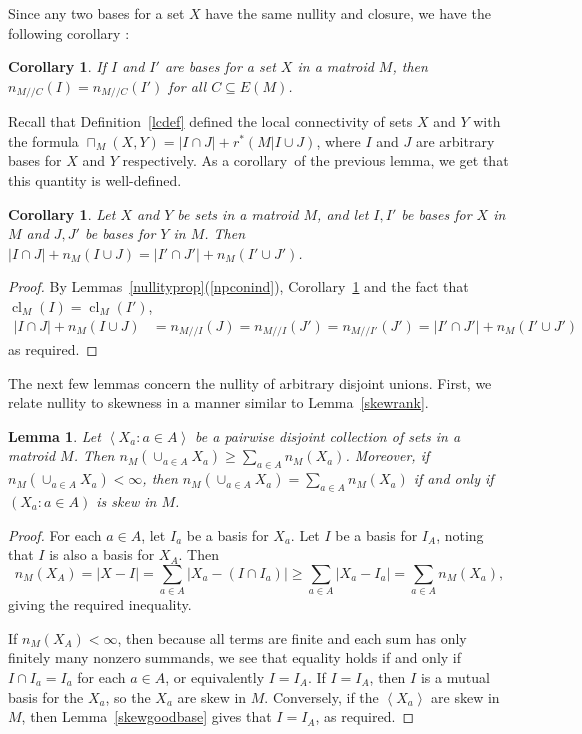 \documentclass{amsart}
\theoremstyle{plain}
\newtheorem{lemma}[theorem]{Lemma}
\newtheorem{corollary}[theorem]{Corollary}
\theoremstyle{definition}
\newcommand{\dcon}{/ \!\! /}
\DeclareMathOperator{\cl}{cl}
\newcommand{\abs}[1]{\left| #1 \right|}
\newcommand{\ab}[1]{\left\langle#1\right\rangle}
\renewcommand{\ge}{\geqslant}
\renewcommand{\ss}{\subseteq}
\begin{document}
Since any two bases for a set $X$ have the same nullity and closure, 
we have the following corollary :


\begin{corollary}\label{basisswitch}
  If $I$ and $I'$ are bases for a set $X$ in a matroid $M$, 
  then $n_{M \dcon C}(I) = n_{M \dcon C}(I')$ for all $C \ss E(M)$. 
\end{corollary}

Recall that Definition~\ref{lcdef} defined the local connectivity of sets $X$ and $Y$ with the formula
$\sqcap_M(X,Y) = |I \cap J| + r^*(M | I \cup J)$, 
where $I$ and $J$ are arbitrary bases for $X$ and $Y$ respectively. 
As a corollary of the previous lemma, we get that this quantity is well-defined. 

\begin{corollary}\label{lcwelldef}
  Let $X$ and $Y$ be sets in a matroid $M$, and let $I,I'$ be bases for $X$ in $M$ and $J,J'$ be bases for $Y$ in $M$. 
  Then $|I \cap J| + n_M(I \cup J) = |I' \cap J'| + n_M(I' \cup J')$. 
\end{corollary}
\begin{proof}
  By Lemmas~\ref{nullityprop}(\ref{npconind}), 
  Corollary~\ref{basisswitch} and the fact that $\cl_M(I) = \cl_M(I')$,
  \begin{align*}
    |I \cap J| + n_M(I \cup J) &= n_{M \dcon I}(J) = n_{M \dcon I}(J') = n_{M \dcon I'}(J') = |I' \cap J'| + n_M(I' \cup J')
  \end{align*}
  as required. 
\end{proof}

The next few lemmas concern the nullity of arbitrary disjoint unions.
First, we relate nullity to skewness in a manner similar to Lemma~\ref{skewrank}.

\begin{lemma}\label{skewnullity}
  Let $\ab{X_a : a \in A}$ be a pairwise disjoint collection of sets in a matroid $M$.
  Then $n_M(\cup_{a \in A} X_a) \ge \sum_{a \in A}n_M(X_a)$.
  Moreover, if $n_M(\cup_{a \in A}X_a) < \infty$, 
  then $n_M(\cup_{a \in A} X_a) = \sum_{a \in A} n_M(X_a)$ if and only if 
      $(X_a : a \in A)$ is skew in $M$.  
\end{lemma}
\begin{proof}
  For each $a \in A$, let $I_a$ be a basis for $X_a$. 
  Let $I$ be a basis for $I_A$, noting that $I$ is also a basis for $X_A$. Then 
  \[n_M(X_A) = |X - I| = \sum_{a \in A}\abs{X_a-(I \cap I_a)} 
  \ge \sum_{a \in A}|X_a - I_a| = \sum_{a \in A} n_M(X_a),\]
  giving the required inequality. 

  If $n_M(X_A) < \infty$, then because all terms are finite and each sum has 
  only finitely many nonzero summands, we see that equality holds if and only if 
  $I \cap I_a = I_a$ for each $a \in A$, or equivalently $I = I_A$. 
  If $I = I_A$, then $I$ is a mutual basis for the $X_a$, so the $X_a$ 
  are skew in $M$. Conversely, if the $\ab{X_a}$ are skew in $M$, then 
  Lemma~\ref{skewgoodbase} gives that $I = I_A$, as required. 
\end{proof}
\end{document}
